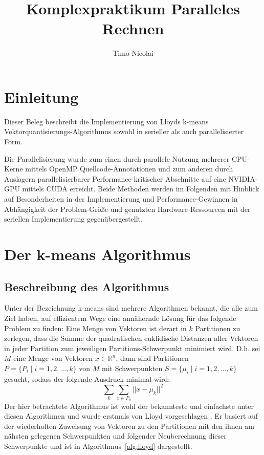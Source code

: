 \documentclass[
    bibliography=totoc, cd=lightcolor, cdmath=false, ngerman]{tudscrreprt}
\begin{document}
\title{Komplexpraktikum Paralleles Rechnen}

\author{
  Timo Nicolai
}


\headingsvskip=-100pt

\maketitle
\tableofcontents
\pagebreak

\chapter{Einleitung}
Dieser Beleg beschreibt die Implementierung von Lloyds k-means
Vektorquantisierungs-Algorithmus sowohl in serieller als auch parallelisierter
Form.

Die Parallelisierung wurde zum einen durch parallele Nutzung mehrerer CPU-Kerne
mittels OpenMP Quellcode-Annotationen und zum anderen durch Auslagern
parallelisierbarer Performance-kritischer Abschnitte auf eine NVIDIA-GPU
mittels CUDA erreicht. Beide Methoden werden im Folgenden mit Hinblick auf
Besonderheiten in der Implementierung und Performance-Gewinnen in Abhängigkeit
der Problem-Größe und genutzten Hardware-Ressourcen mit der seriellen
Implementierung gegenübergestellt.

\chapter{Der k-means Algorithmus}

\section{Beschreibung des Algorithmus}

Unter der Bezeichnung k-means sind mehrere Algorithmen bekannt, die alle zum
Ziel haben, auf effizientem Wege eine annähernde Lösung für das folgende Problem
zu finden:
\bigbreak
Eine Menge von Vektoren ist derart in $k$ Partitionen zu zerlegen, dass die
Summe der quadratischen euklidische Distanzen aller Vektoren in jeder Partition
zum jeweiligen Partitions-Schwerpunkt minimiert wird. D.h. sei $M$ eine Menge
von Vektoren $x \in \mathbb{R}^n$, dann sind Partitionen $P = \{P_i \mid i =
1,2,\dots,k\}$ von $M$ mit Schwerpunkten $S = \{\mu_i \mid i = 1, 2, \dots,
k\}$ gesucht, sodass der folgende Ausdruck minimal wird:
$$
\sum_{k} \sum_{x \in P_k} ||x - \mu_k||^2
$$
Der hier betrachtete Algorithmus ist wohl der bekannteste und einfachste unter
diesen Algorithmen und wurde erstmals von Lloyd vorgeschlagen \cite{bib:lloyd}.
Er basiert auf der wiederholten Zuweisung von Vektoren zu den Partitionen mit
den ihnen am nähsten gelegenen Schwerpunkten und folgender Neuberechnung dieser
Schwerpunkte und ist in Algorithmus~\ref{alg:lloyd} dargestellt.
\end{document}
